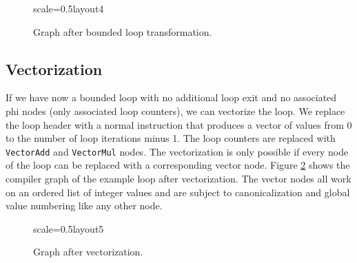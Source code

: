 \documentclass[twocolumn]{svjour3}
\begin{document}
\begin{figure}[h]
  \centering
\begin{digraphenv}{scale=0.5}{layout4}
\end{digraphenv}
  \caption{Graph after bounded loop transformation.}
  \label{fig:loop4}
\end{figure}

\subsection{Vectorization}

If we have now a bounded loop with no additional loop exit and no associated phi nodes (only associated loop counters), we can vectorize the loop.
We replace the loop header with a normal instruction that produces a vector of values from 0 to the number of loop iterations minus 1.
The loop counters are replaced with \texttt{VectorAdd} and \texttt{VectorMul} nodes.
The vectorization is only possible if every node of the loop can be replaced with a corresponding vector node.
Figure \ref{fig:loop5} shows the compiler graph of the example loop after vectorization.
The vector nodes all work on an ordered list of integer values and are subject to canonicalization and global value numbering like any other node.


\begin{figure}[h]
  \centering
\begin{digraphenv}{scale=0.5}{layout5}
\end{digraphenv}
  \caption{Graph after vectorization.}
  \label{fig:loop5}
\end{figure}
\end{document}

